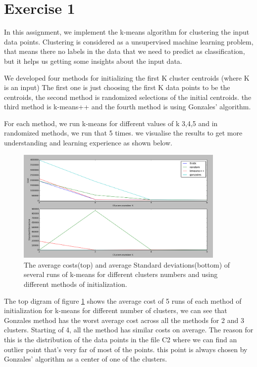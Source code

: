 \section*{Exercise 1}
In this assignment, we implement the k-means algorithm for clustering the input data points.
Clustering is considered as a unsupervised machine learning problem, that means there no labels in the data that we need to predict as classification, but it helps us getting some insights about the input data.

We developed four methods for initializing the first K cluster centroids (where K is an input)
The first one is just choosing the first K data points to be the centroids, the second method is randomized selections of the initial centroids. the third method is k-means++
and the fourth method is using Gonzales’ algorithm.

For each method, we run k-means for different values of k {3,4,5} and in randomized methods, we run that 5 times. we visualise the results to get more understanding and learning experience as shown below.


\begin{figure}[!htb]
\centering
\includegraphics[width=0.9\textwidth]{shots/std_mean.png}
\caption{The average costs(top) and average Standard deviations(bottom) of several runs of k-means for different clusters numbers and using different methods of initialization.}
\label{std_mean}
\end{figure}

The top digram of figure \ref{std_mean} shows the average cost of 5 runs of each method of initialization for k-means for different number of clusters, we can see that Gonzales method has the worst average cost across all the methods for 2 and 3 clusters. Starting of 4, all the method has similar costs on average. The reason for this is the distribution of the data points in the file C2 where we can find an outlier point that's very far of most of the points. this point is always chosen by Gonzales' algorithm as a center of one of the clusters.

